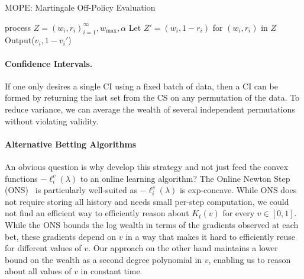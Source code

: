 \begin{algorithm}[tb]
   \caption{MOPE: Martingale Off-Policy Evaluation}
   \label{alg:main}
\begin{algorithmic}
     process $Z=(w_i,r_i)_{i=1}^\infty, w_{\max}, \alpha$
    \STATE Let $Z' = (w_i,1-r_i)$ for $(w_i,r_i)$ in $Z$
        \STATE Output($v_i,1-v_i'$)
   \ENDFOR
{}
\ENDFUNCTION
\end{algorithmic}
\end{algorithm}


\paragraph{Confidence Intervals.} If one only desires a single CI using a fixed batch of data, then a CI can be formed by returning the last set from the CS on any permutation of the data.  To reduce variance, we can average the wealth of several independent permutations without violating validity.

\paragraph{Alternative Betting Algorithms}
An obvious question is why develop this strategy 
and not just feed the 
convex functions $-\ell_i^v(\lambda)$ to an online 
learning algorithm? 
The Online Newton Step
(ONS)~\cite{hazan2007logarithmic}
is particularly well-suited
as $-\ell_i^v(\lambda)$ is exp-concave.
While ONS does not require storing all history and needs
small per-step computation, we could not find an 
efficient way to efficiently reason about 
$K_t(v)$ for every $v \in [0,1]$.
While the ONS bounds the log wealth in terms
of the gradients observed at each bet, these gradients depend on $v$ in a way
that makes it hard to efficiently reuse for different values of $v$. 
Our approach on the other hand maintains a lower bound on the wealth 
as a second degree polynomial in $v$, enabling us to reason about 
all values of $v$ in constant time. 

